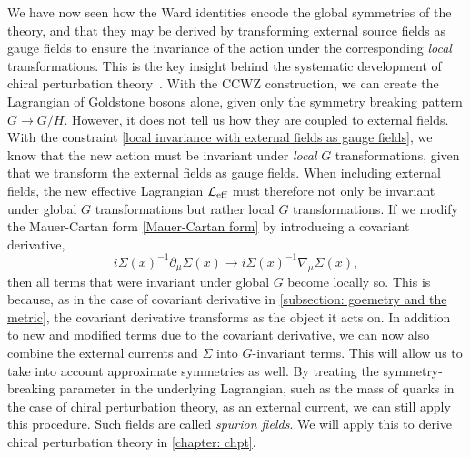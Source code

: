 We have now seen how the Ward identities encode the global symmetries of the theory, and that they may be derived by transforming external source fields as gauge fields to ensure the invariance of the action under the corresponding \emph{local} transformations.
This is the key insight behind the systematic development of chiral perturbation theory~\autocite{gasserChiralPerturbationTheory1984,gasserChiralPerturbationTheory1985,leutwylerFoundationsChiralPerturbation1994}.
With the CCWZ construction, we can create the Lagrangian of Goldstone bosons alone, given only the symmetry breaking pattern $G \rightarrow G/H$.
However, it does not tell us how they are coupled to external fields.
With the constraint \autoref{local invariance with external fields as gauge fields}, we know that the new action must be invariant under \emph{local} $G$ transformations, given that we transform the external fields as gauge fields.
When including external fields, the new effective Lagrangian $\mathcal{L}_\text{eff}$ must therefore not only be invariant under global $G$ transformations but rather local $G$ transformations.
If we modify the Mauer-Cartan form \autoref{Mauer-Cartan form} by introducing a covariant derivative,
%
\begin{equation}
    i\Sigma(x)^{-1} \partial_\mu \Sigma(x)
    \rightarrow i\Sigma(x)^{-1} \nabla_\mu \Sigma(x),
\end{equation}
%
then all terms that were invariant under global $G$ become locally so.
This is because, as in the case of covariant derivative in \autoref{subsection: goemetry and the metric}, the covariant derivative transforms as the object it acts on.
In addition to new and modified terms due to the covariant derivative, we can now also combine the external currents and $\Sigma$ into $G$-invariant terms.
This will allow us to take into account approximate symmetries as well.
By treating the symmetry-breaking parameter in the underlying Lagrangian, such as the mass of quarks in the case of chiral perturbation theory, as an external current, we can still apply this procedure.
Such fields are called \emph{spurion fields}.
We will apply this to derive chiral perturbation theory in \autoref{chapter: chpt}.

